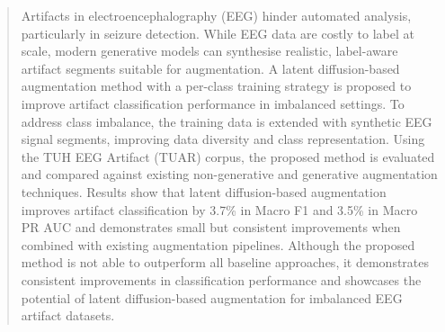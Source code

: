 \begin{abstract}

Artifacts in electroencephalography (EEG) hinder automated analysis, particularly in seizure detection. While EEG data are costly to label at scale, modern generative models can synthesise realistic, label-aware artifact segments suitable for augmentation. A latent diffusion-based augmentation method with a per-class training strategy is proposed to improve artifact classification performance in imbalanced settings. To address class imbalance, the training data is extended with synthetic EEG signal segments, improving data diversity and class representation. Using the TUH EEG Artifact (TUAR) corpus, the proposed method is evaluated and compared against existing non-generative and generative augmentation techniques. Results show that latent diffusion-based augmentation improves artifact classification by 3.7\% in Macro F1 and 3.5\% in Macro PR AUC and demonstrates small but consistent improvements when combined with existing augmentation pipelines. Although the proposed method is not able to outperform all baseline approaches, it demonstrates consistent improvements in classification performance and showcases the potential of latent diffusion-based augmentation for imbalanced EEG artifact datasets. 

\end{abstract}